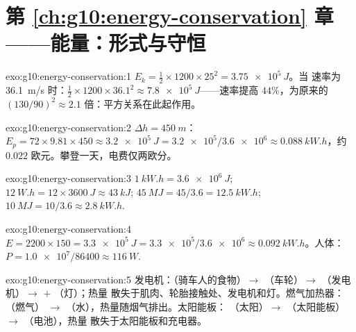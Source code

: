 \section*{第 \ref{ch:g10:energy-conservation} 章——能量：形式与守恒}

\begin{solution}{exo:g10:energy-conservation:1}
$E_k = \tfrac12 \times 1200 \times 25^2 = \qty{3.75e5}{J}$。当
速率为 \qty{36.1}{m/s} 时：$\tfrac12 \times 1200 \times 36.1^2 \approx
\qty{7.8e5}{J}$——速率提高 $44\%$，为原来的 $(130/90)^2 \approx 2.1$
倍：平方关系在此起作用。
\end{solution}

\begin{solution}{exo:g10:energy-conservation:2}
$\Delta h = \qty{450}{m}$：
$E_p = 72 \times 9.81 \times 450 \approx \qty{3.2e5}{J}
= \num{3.2e5}/\num{3.6e6} \approx \qty{0.088}{kW.h}$，约 
$0.022$ 欧元。攀登一天，电费仅两欧分。
\end{solution}

\begin{solution}{exo:g10:energy-conservation:3}
$\qty{1}{kW.h} = \qty{3.6e6}{J}$;
$\qty{12}{W.h} = 12 \times \qty{3600}{J} \approx \qty{43}{kJ}$;
$\qty{45}{MJ} = 45/3.6 = \qty{12.5}{kW.h}$;
$\qty{10}{MJ} = 10/3.6 \approx \qty{2.8}{kW.h}$.
\end{solution}

\begin{solution}{exo:g10:energy-conservation:4}
$E = 2200 \times 150 = \qty{3.3e5}{J}
= \num{3.3e5}/\num{3.6e6} \approx \qty{0.092}{kW.h}$。人体：
$P = \num{1.0e7}/\num{86400} \approx \qty{116}{W}$.
\end{solution}

\begin{solution}{exo:g10:energy-conservation:5}
发电机：（骑车人的食物）$\to$ （车轮）$\to$
（发电机）$\to$  $+$ （灯）；热量
散失于肌肉、轮胎接触处、发电机和灯。燃气加热器：（燃气）
$\to$ （水），热量随烟气排出。太阳能板：
（太阳）$\to$ （太阳能板）$\to$ （电池），热量
散失于太阳能板和充电器。
\end{solution}

